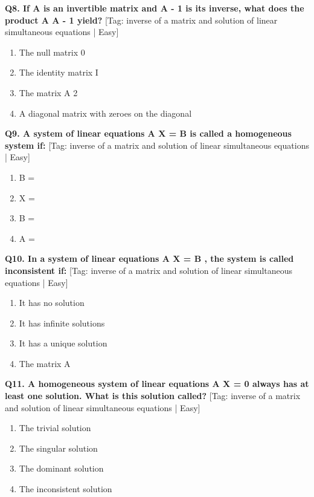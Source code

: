 \noindent\textbf{Q8. If A is an invertible matrix and A - 1 is its inverse, what does the product A A - 1 yield?} \hfill [Tag: inverse of a matrix and solution of linear simultaneous equations | Easy]
\begin{enumerate}[label=(\alph*),topsep=2pt,itemsep=1pt,partopsep=0pt,parsep=0pt]
    \item {{The null matrix 0}}
    \item {{The identity matrix I}}
    \item {{The matrix A 2}}
    \item {{A diagonal matrix with zeroes on the diagonal}}
\end{enumerate}
\vspace{2mm}

\noindent\textbf{Q9. A system of linear equations A X = B is called a homogeneous system if:} \hfill [Tag: inverse of a matrix and solution of linear simultaneous equations | Easy]
\begin{enumerate}[label=(\alph*),topsep=2pt,itemsep=1pt,partopsep=0pt,parsep=0pt]
    \item {{B =}}
    \item {{X =}}
    \item {{B =}}
    \item {{A =}}
\end{enumerate}
\vspace{2mm}

\noindent\textbf{Q10. In a system of linear equations A X = B , the system is called inconsistent if:} \hfill [Tag: inverse of a matrix and solution of linear simultaneous equations | Easy]
\begin{enumerate}[label=(\alph*),topsep=2pt,itemsep=1pt,partopsep=0pt,parsep=0pt]
    \item {{It has no solution}}
    \item {{It has infinite solutions}}
    \item {{It has a unique solution}}
    \item {{The matrix A}}
\end{enumerate}
\vspace{2mm}

\noindent\textbf{Q11. A homogeneous system of linear equations A X = 0 always has at least one solution. What is this solution called?} \hfill [Tag: inverse of a matrix and solution of linear simultaneous equations | Easy]
\begin{enumerate}[label=(\alph*),topsep=2pt,itemsep=1pt,partopsep=0pt,parsep=0pt]
    \item {{The trivial solution}}
    \item {{The singular solution}}
    \item {{The dominant solution}}
    \item {{The inconsistent solution}}
\end{enumerate}
\vspace{2mm}

